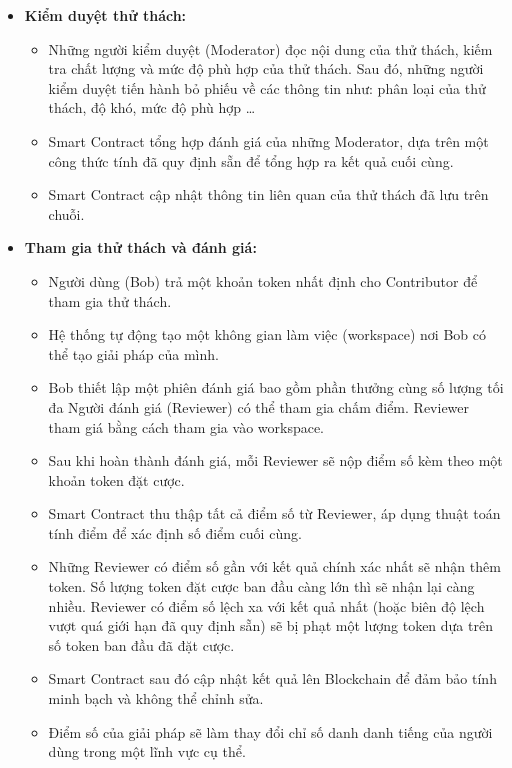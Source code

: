 \documentclass{article}[14pt]
\begin{document}
{\begin{enumerate}[label=\textbf{\alph*.}]
\begin{itemize}
                    \item \textbf{Kiểm duyệt thử thách:}
                    \begin{itemize}
                        \item Những người kiểm duyệt (Moderator) đọc nội dung của thử thách, kiếm tra chất lượng và mức độ phù hợp của thử thách. Sau đó, những người kiểm duyệt tiến hành bỏ phiếu về các thông tin như: phân loại của thử thách, độ khó, mức độ phù hợp \dots
                        \item Smart Contract tổng hợp đánh giá của những Moderator, dựa trên một công thức tính đã quy định sẵn để tổng hợp ra kết quả cuối cùng. 
                        \item Smart Contract cập nhật thông tin liên quan của thử thách đã lưu trên chuỗi. 
                    \end{itemize} 

                    \item \textbf{Tham gia thử thách và đánh giá:}
                    \begin{itemize}
                        \item Người dùng (Bob) trả một khoản token nhất định cho Contributor để tham gia thử thách.
                        \item Hệ thống tự động tạo một không gian làm việc (workspace) nơi Bob có thể tạo giải pháp của mình. 
                        \item Bob thiết lập một phiên đánh giá bao gồm phần thưởng cùng số lượng tối đa Người đánh giá (Reviewer) có thể tham gia chấm điểm. Reviewer tham giá bằng cách tham gia vào workspace.
                        \item Sau khi hoàn thành đánh giá, mỗi Reviewer sẽ nộp điểm số kèm theo một khoản token đặt cược.
                        \item Smart Contract thu thập tất cả điểm số từ Reviewer, áp dụng thuật toán tính điểm để xác định số điểm cuối cùng.
                        \item Những Reviewer có điểm số gần với kết quả chính xác nhất sẽ nhận thêm token. Số lượng token đặt cược ban đầu càng lớn thì sẽ nhận lại càng nhiều. Reviewer có điểm số lệch xa với kết quả nhất (hoặc biên độ lệch vượt quá giới hạn đã quy định sẵn) sẽ bị phạt một lượng token dựa trên số token ban đầu đã đặt cược.  
                        \item Smart Contract sau đó cập nhật kết quả lên Blockchain để đảm bảo tính minh bạch và không thể chỉnh sửa.
                        \item Điểm số của giải pháp sẽ làm thay đổi chỉ số danh danh tiếng của người dùng trong một lĩnh vực cụ thể.
                    \end{itemize} 


\end{itemize}
\end{enumerate}}
\end{document}
